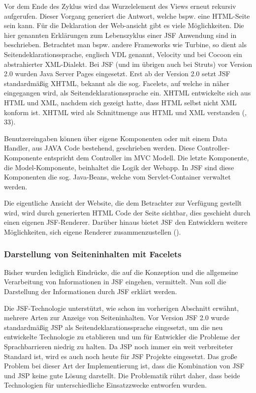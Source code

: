 Vor dem Ende des Zyklus wird das Wurzelelement des Views erneut rekursiv aufgerufen. Dieser Vorgang generiert die Antwort, welche bspw. eine HTML-Seite sein kann. Für die Deklaration der Web-ansicht
gibt es viele Möglichkeiten.
Die hier genannten Erklärungen zum Lebenszyklus einer JSF Anwendung sind in \cite{IrianLfCycl} beschrieben.
Betrachtet man bspw. andere Frameworks wie \gls{Turbine}, so dient als Seitendeklarationssprache, englisch \ac{VDL} genannt, \gls{Velocity} und bei \gls{Cocoon} ein abstrahierter XML-Dialekt. Bei JSF (und im übrigen auch bei \gls{Struts}) vor Version 2.0 wurden Java Server Pages eingesetzt.
Erst ab der Version 2.0 setzt JSF standardmäßig XHTML, bekannt als die sog. Facelets, auf welche in  näher eingegangen wird, als Seitendeklarationssprache ein. XHTML entwickelte sich aus HTML und XML, nachdem sich gezeigt hatte, dass HTML selbst nicht XML konform ist. XHTML wird als Schnittmenge aus HTML und XML verstanden (\cite{BaRiSch-WT}, 33).

Benutzereingaben können über eigene Komponenten oder mit einem Data Handler, aus JAVA Code bestehend, geschrieben werden. Diese Controller-Komponente entspricht dem Controller im \ac{MVC} Modell.
Die letzte Komponente, die Model-Komponente, beinhaltet die Logik der Webapp. In JSF sind diese Komponenten die sog. \gls{Java-Beans}, welche vom Servlet-Container verwaltet werden.

Die eigentliche Ansicht der Website, die dem Betrachter zur Verfügung gestellt wird, wird durch generierten HTML Code der Seite sichtbar, dies geschieht durch einen eigenen JSF-Renderer.
Darüber hinaus bietet JSF den Entwicklern weitere Möglichkeiten, sich eigene Renderer zusammenzustellen (\cite{WikiJSF01}).

\subsubsection{Darstellung von Seiteninhalten mit Facelets}\label{subsec:Darstellung von Seiteninhalten}
Bisher wurden lediglich Eindrücke, die auf die Konzeption und die allgemeine Verarbeitung von Informationen in JSF eingehen, vermittelt. Nun soll die Darstellung der Informationen durch JSF erklärt werden.

Die JSF-Technologie unterstützt, wie schon im vorherigen Abschnitt erwähnt, mehrere Arten zur Anzeige von Seiteninhalten. 
Vor Version JSF 2.0 wurde standardmäßig JSP als Seitendeklarationssprache eingesetzt, um die neu entwickelte Technologie zu etablieren und um für Entwickler die Probleme der Sprachbarrieren niedrig zu halten.
Da JSP noch immer ein weit verbreiteter Standard ist, wird es auch noch heute für JSF Projekte eingesetzt.
Das große Problem bei dieser Art der Implementierung ist, dass die Kombination von JSF und JSP keine gute Lösung darstellt. Die Problematik rührt daher, dass beide Technologien für unterschiedliche Einsatzzwecke entworfen wurden.

